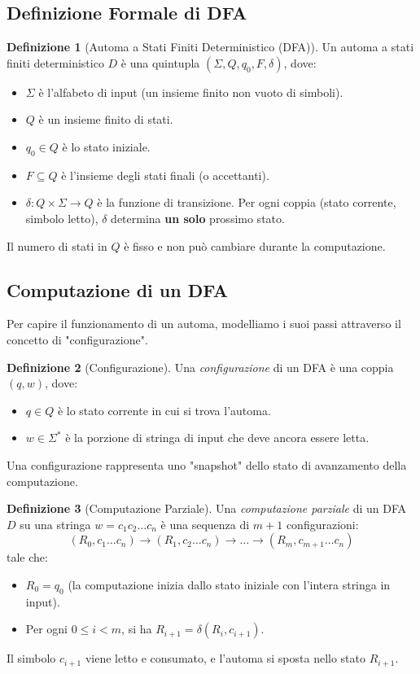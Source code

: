 \documentclass[a4paper]{article}
\theoremstyle{definition} %
\newtheorem{definition}{Definizione}[section]
\begin{document}
\subsection{Definizione Formale di DFA}
\begin{definition}[Automa a Stati Finiti Deterministico (DFA)]
Un automa a stati finiti deterministico $D$ è una quintupla $( \Sigma, Q, q_0, F, \delta )$, dove:
\begin{itemize}
    \item $\Sigma$ è l'alfabeto di input (un insieme finito non vuoto di simboli).
    \item $Q$ è un insieme finito di stati.
    \item $q_0 \in Q$ è lo stato iniziale.
    \item $F \subseteq Q$ è l'insieme degli stati finali (o accettanti).
    \item $\delta: Q \times \Sigma \to Q$ è la funzione di transizione. Per ogni coppia (stato corrente, simbolo letto), $\delta$ determina \textbf{un solo} prossimo stato.
\end{itemize}
\end{definition}
Il numero di stati in $Q$ è fisso e non può cambiare durante la computazione.

\subsection{Computazione di un DFA}
Per capire il funzionamento di un automa, modelliamo i suoi passi attraverso il concetto di "configurazione".

\begin{definition}[Configurazione]
Una \emph{configurazione} di un DFA è una coppia $(q, w)$, dove:
\begin{itemize}
    \item $q \in Q$ è lo stato corrente in cui si trova l'automa.
    \item $w \in \Sigma^*$ è la porzione di stringa di input che deve ancora essere letta.
\end{itemize}
Una configurazione rappresenta uno "snapshot" dello stato di avanzamento della computazione.
\end{definition}

\begin{definition}[Computazione Parziale]
Una \emph{computazione parziale} di un DFA $D$ su una stringa $w = c_1 c_2 \dots c_n$ è una sequenza di $m+1$ configurazioni:
\[ (R_0, c_1 \dots c_n) \xrightarrow{} (R_1, c_2 \dots c_n) \xrightarrow{} \dots \xrightarrow{} (R_m, c_{m+1} \dots c_n) \]
tale che:
\begin{itemize}
    \item $R_0 = q_0$ (la computazione inizia dallo stato iniziale con l'intera stringa in input).
    \item Per ogni $0 \leq i < m$, si ha $R_{i+1} = \delta(R_i, c_{i+1})$.
\end{itemize}
Il simbolo $c_{i+1}$ viene letto e consumato, e l'automa si sposta nello stato $R_{i+1}$.
\end{definition}
\end{document}
